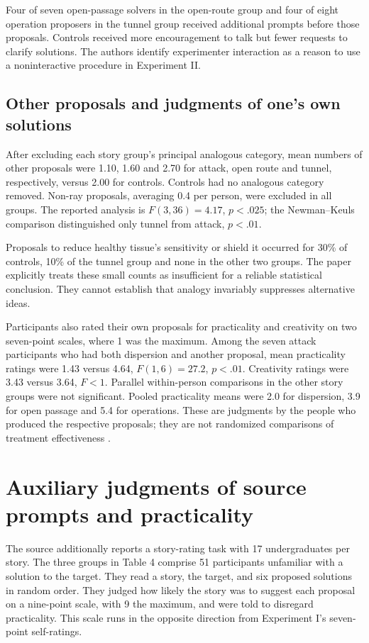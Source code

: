 Four of seven open-passage solvers in the open-route group
and four of eight operation proposers in the tunnel group
received additional prompts before those proposals.
Controls received more encouragement to talk but fewer
requests to clarify solutions. The authors identify
experimenter interaction as a reason to use a noninteractive
procedure in Experiment II.

\subsection{Other proposals and judgments of one's own solutions}

After excluding each story group's principal analogous
category, mean numbers of other proposals were 1.10,
1.60 and 2.70 for attack, open route and tunnel,
respectively, versus 2.00 for controls. Controls had
no analogous category removed. Non-ray proposals,
averaging 0.4 per person, were excluded in all groups.
The reported analysis is \(F(3,36)=4.17\), \(p<.025\);
the Newman--Keuls comparison distinguished only tunnel
from attack, \(p<.01\).

Proposals to reduce healthy tissue's sensitivity or
shield it occurred for 30\% of controls, 10\% of the
tunnel group and none in the other two groups.
The paper explicitly treats these small counts as
insufficient for a reliable statistical conclusion.
They cannot establish that analogy invariably suppresses
alternative ideas.

Participants also rated their own proposals for
practicality and creativity on two seven-point scales,
where 1 was the maximum. Among the seven attack
participants who had both dispersion and another
proposal, mean practicality ratings were 1.43 versus
4.64, \(F(1,6)=27.2\), \(p<.01\). Creativity ratings
were 3.43 versus 3.64, \(F<1\). Parallel within-person
comparisons in the other story groups were not
significant. Pooled practicality means were 2.0 for
dispersion, 3.9 for open passage and 5.4 for operations.
These are judgments by the people who produced the
respective proposals; they are not randomized comparisons
of treatment effectiveness
\cite[pp.~323--325]{GickHolyoak1980AnalogicalProblemSolving}.

\section{Auxiliary judgments of source prompts and practicality}
\label{sec:p19-analogy-auxiliary}

The source additionally reports a story-rating task
with 17 undergraduates per story. The three groups
in Table 4 comprise 51 participants unfamiliar with
a solution to the target. They read a story, the
target, and six proposed solutions in random order.
They judged how likely the story was to suggest
each proposal on a nine-point scale, with 9 the
maximum, and were told to disregard practicality.
This scale runs in the opposite direction from
Experiment I's seven-point self-ratings.

